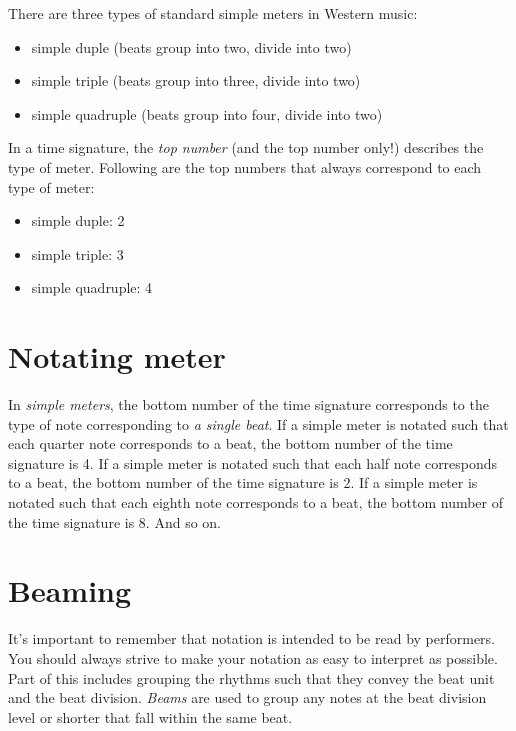 \documentclass{book}
\providecommand{\tightlist}{%
  \setlength{\itemsep}{0pt}\setlength{\parskip}{0pt}}
\begin{document}
There are three types of standard simple meters in Western music:

\begin{itemize}
\tightlist
\item
  simple duple (beats group into two, divide into two)
\item
  simple triple (beats group into three, divide into two)
\item
  simple quadruple (beats group into four, divide into two)
\end{itemize}

In a time signature, the \emph{top number} (and the top number only!)
describes the type of meter. Following are the top numbers that always
correspond to each type of meter:

\begin{itemize}
\tightlist
\item
  simple duple: 2
\item
  simple triple: 3
\item
  simple quadruple: 4
\end{itemize}

\hypertarget{notating-meter}{%
\section{Notating meter}\label{notating-meter}}

In \emph{simple meters}, the bottom number of the time signature corresponds
to the type of note corresponding to \emph{a single beat}. If a simple meter
is notated such that each quarter note corresponds to a beat, the bottom
number of the time signature is 4. If a simple meter is notated such that each
half note corresponds to a beat, the bottom number of the time signature is 2.
If a simple meter is notated such that each eighth note corresponds to a beat,
the bottom number of the time signature is 8. And so on.

\hypertarget{beaming}{%
\section{Beaming}\label{beaming}}

It's important to remember that notation is intended to be read by performers.
You should always strive to make your notation as easy to interpret as
possible. Part of this includes grouping the rhythms such that they convey the
beat unit and the beat division. \emph{Beams} are used to group any notes at
the beat division level or shorter that fall within the same beat.
\end{document}
